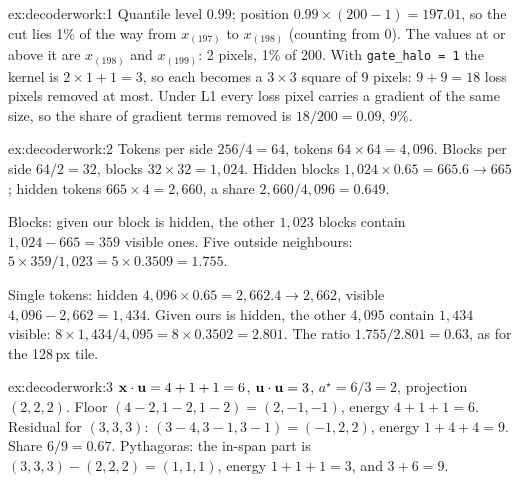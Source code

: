 
\begin{solution}{ex:decoderwork:1}
Quantile level $0.99$; position $0.99\times(200-1)=197.01$, so the cut lies 1\% of the way from $x_{(197)}$ to
$x_{(198)}$ (counting from 0). The values at or above it are $x_{(198)}$ and $x_{(199)}$: 2 pixels, 1\% of 200.
With \texttt{gate\_halo = 1} the kernel is $2\times1+1=3$, so each becomes a $3\times3$ square of 9 pixels:
$9+9=18$ loss pixels removed at most. Under L1 every loss pixel carries a gradient of the same size, so the
share of gradient terms removed is $18/200=0.09$, 9\%.
\end{solution}

\begin{solution}{ex:decoderwork:2}
Tokens per side $256/4=64$, tokens $64\times64=4{,}096$. Blocks per side $64/2=32$, blocks $32\times32=1{,}024$.
Hidden blocks $1{,}024\times0.65=665.6\to665$; hidden tokens $665\times4=2{,}660$, a share
$2{,}660/4{,}096=0.649$.

Blocks: given our block is hidden, the other $1{,}023$ blocks contain $1{,}024-665=359$ visible ones. Five outside
neighbours: $5\times359/1{,}023=5\times0.3509=1.755$.

Single tokens: hidden $4{,}096\times0.65=2{,}662.4\to2{,}662$, visible $4{,}096-2{,}662=1{,}434$. Given ours is
hidden, the other $4{,}095$ contain $1{,}434$ visible: $8\times1{,}434/4{,}095=8\times0.3502=2.801$.
The ratio $1.755/2.801=0.63$, as for the 128\,px tile.
\end{solution}

\begin{solution}{ex:decoderwork:3}
$\mathbf{x}\cdot\mathbf{u}=4+1+1=6$, $\mathbf{u}\cdot\mathbf{u}=3$, $a^\star=6/3=2$, projection $(2,2,2)$. Floor
$(4-2,1-2,1-2)=(2,-1,-1)$, energy $4+1+1=6$. Residual for $(3,3,3)$: $(3-4,3-1,3-1)=(-1,2,2)$, energy
$1+4+4=9$. Share $6/9=0.67$. Pythagoras: the in-span part is $(3,3,3)-(2,2,2)=(1,1,1)$, energy $1+1+1=3$, and
$3+6=9$. \checkmark
\end{solution}

